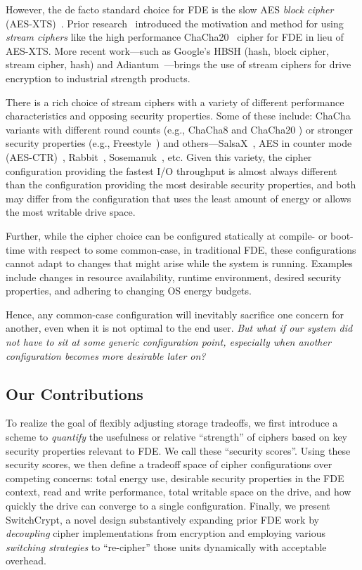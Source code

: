 However, the de facto standard choice for FDE is the slow AES \emph{block
cipher} (AES-XTS)~\cite{AES, AES-XTS}. Prior research~\cite{StrongBox}
introduced the motivation and method for using \emph{stream ciphers} like the
high performance ChaCha20~\cite{ChaCha20} cipher for FDE in lieu of AES-XTS.
More recent work---such as Google's HBSH (hash, block cipher, stream cipher,
hash) and Adiantum~\cite{HBSH, Adiantum}---brings the use of stream ciphers for
drive encryption to industrial strength products.

There is a rich choice of stream ciphers with a variety of different performance
characteristics and opposing security properties. Some of these include: ChaCha
variants with different round counts (e.g., ChaCha8 \cite{ChaCha8} and ChaCha20
\cite{ChaCha20}) or stronger security properties (e.g.,
Freestyle~\cite{Freestyle}) and others---SalsaX~\cite{SalsaX}, AES in counter
mode (AES-CTR)~\cite{AES-CTR}, Rabbit~\cite{Rabbit}, Sosemanuk~\cite{Sosemanuk},
etc. Given this variety, the cipher configuration providing the fastest I/O
throughput is almost always different than the configuration providing the most
desirable security properties, and both may differ from the configuration that
uses the least amount of energy or allows the most writable drive space.

Further, while the cipher choice can be configured statically at compile- or
boot-time with respect to some common-case, in traditional FDE, these
configurations cannot adapt to changes that might arise while the system is
running. Examples include changes in resource availability, runtime environment,
desired security properties, and adhering to changing OS energy budgets.

Hence, any common-case configuration will inevitably sacrifice one concern for
another, even when it is not optimal to the end user. \emph{But what if our
system did not have to sit at some generic configuration point, especially when
another configuration becomes more desirable later on?}

\subsection{Our Contributions}

To realize the goal of flexibly adjusting storage tradeoffs, we first introduce
a scheme to \emph{quantify} the usefulness or relative ``strength'' of ciphers
based on key security properties relevant to FDE. We call these ``security
scores''. Using these security scores, we then define a tradeoff space of cipher
configurations over competing concerns: total energy use, desirable security
properties in the FDE context, read and write performance, total writable space
on the drive, and how quickly the drive can converge to a single configuration.
Finally, we present SwitchCrypt, a novel design substantively expanding prior
FDE work by \emph{decoupling} cipher implementations from encryption and
employing various \emph{switching strategies} to ``re-cipher'' those units
dynamically with acceptable overhead.


